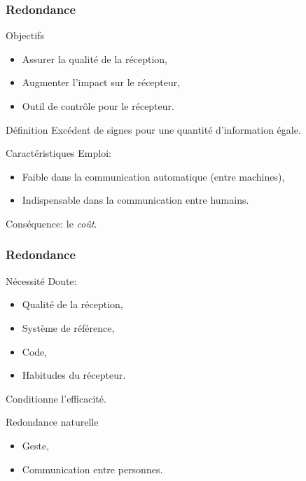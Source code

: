 \begin{frame}
	\frametitle{Redondance}
	\begin{block}{Objectifs}
		\begin{itemize}
			\item Assurer la qualité de la réception,
			\item Augmenter l'impact sur le récepteur,
			\item Outil de contrôle pour le récepteur.
		\end{itemize}
	\end{block}
	\pause
	\begin{exampleblock}{Définition}
		Excédent de signes pour une quantité d'information égale.
	\end{exampleblock}
	\pause
	\begin{block}{Caractéristiques}
		Emploi:
		\begin{itemize}
			\item Faible dans la communication automatique (entre machines),
			\item Indispensable dans la communication entre humains.
		\end{itemize}

		Conséquence: le \emph{coût}.
	\end{block}
\end{frame}
\begin{frame}
	\frametitle{Redondance}
	\begin{block}{Nécessité}
		Doute:
		\begin{itemize}
			\item Qualité de la réception,
			\item Système de référence,
			\item Code,
			\item Habitudes du récepteur.
		\end{itemize}

		Conditionne l'efficacité.
	\end{block}
	\pause
	\begin{exampleblock}{Redondance naturelle}
		\begin{itemize}
			\item Geste,
			\item Communication entre personnes.
		\end{itemize}
	\end{exampleblock}
\end{frame}
